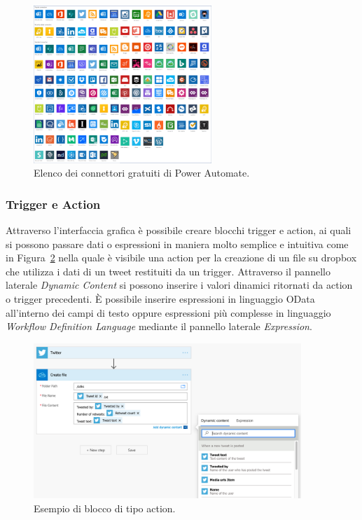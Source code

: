 \begin{figure}[ht!]
  \centering
  \includegraphics[width=0.6\textwidth]{connectors.png}
  \caption{Elenco dei connettori gratuiti di Power Automate.}
  \label{fig:connectors}
\end{figure}

\subsubsection{Trigger e Action}
Attraverso l'interfaccia grafica è possibile creare blocchi trigger e action, ai quali si possono passare dati o espressioni in maniera molto semplice e intuitiva come in Figura~\ref{fig:actionExample} nella quale è visibile una action per la creazione di un file su dropbox che utilizza i dati di un tweet restituiti da un trigger. Attraverso il pannello laterale \textit{Dynamic Content} si possono inserire i valori dinamici ritornati da action o trigger precedenti. È possibile inserire espressioni in linguaggio OData all'interno dei campi di testo oppure espressioni più complesse  in linguaggio \textit{Workflow Definition Language} mediante il pannello laterale \textit{Expression}\cite{WorkflowDefinitioLanguage}.
\begin{figure}[ht]
  \centering
  \includegraphics[width=0.9\textwidth]{action-example.png}
  \caption{Esempio di blocco di tipo action.}
  \label{fig:actionExample}
\end{figure}

